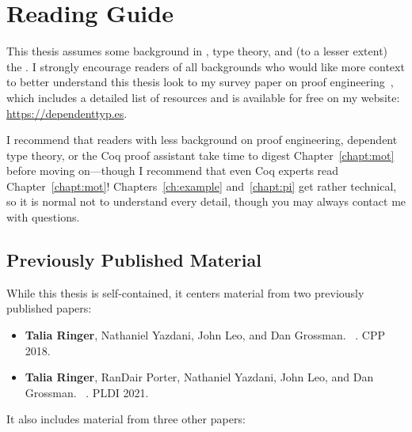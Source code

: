 \section{Reading Guide}


This thesis assumes some background in , type theory, and (to a lesser extent) the  . 
I strongly encourage readers of all backgrounds who would like more context to better understand this thesis
look to my survey paper on proof engineering~\cite{PGL-045}, which includes a detailed list of resources
and is available for free on my website: \url{https://dependenttyp.es}.

I recommend that readers with less background on proof engineering, dependent type theory, or the Coq proof assistant
take time to digest Chapter~\ref{chapt:mot} before moving on---though I recommend that even Coq experts read Chapter~\ref{chapt:mot}!
Chapters~\ref{ch:example} and~\ref{chapt:pi} get rather technical, so it is normal not to understand every detail,
though you may always contact me with questions.

\subsection*{Previously Published Material}

While this thesis is self-contained, it centers material from two previously published papers:

\begin{itemize}
\item \textbf{Talia Ringer}, Nathaniel Yazdani, John Leo, and Dan Grossman. ~\cite{ringer2018adapting}. CPP 2018.
\item \textbf{Talia Ringer}, RanDair Porter, Nathaniel Yazdani, John Leo, and Dan Grossman. ~\cite{Ringer2021}. PLDI 2021.
\end{itemize}
It also includes material from three other papers:

